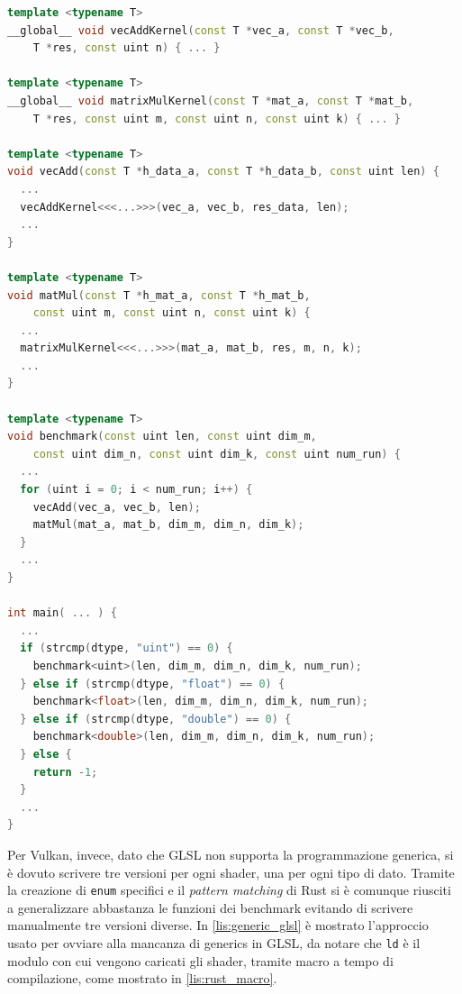 \newpage
\vspace{5mm}
\begin{lstlisting}[language=C++, caption=Programmazione generica in CUDA, label=lis:generic_cuda]
template <typename T>
__global__ void vecAddKernel(const T *vec_a, const T *vec_b,
    T *res, const uint n) { ... }

template <typename T>
__global__ void matrixMulKernel(const T *mat_a, const T *mat_b,
    T *res, const uint m, const uint n, const uint k) { ... }

template <typename T>
void vecAdd(const T *h_data_a, const T *h_data_b, const uint len) {
  ...
  vecAddKernel<<<...>>>(vec_a, vec_b, res_data, len);
  ...
}

template <typename T>
void matMul(const T *h_mat_a, const T *h_mat_b,
    const uint m, const uint n, const uint k) {
  ...
  matrixMulKernel<<<...>>>(mat_a, mat_b, res, m, n, k);
  ...
}

template <typename T>
void benchmark(const uint len, const uint dim_m,
    const uint dim_n, const uint dim_k, const uint num_run) {
  ...
  for (uint i = 0; i < num_run; i++) {
    vecAdd(vec_a, vec_b, len);
    matMul(mat_a, mat_b, dim_m, dim_n, dim_k);
  }
  ...
}

int main( ... ) {
  ...
  if (strcmp(dtype, "uint") == 0) {
    benchmark<uint>(len, dim_m, dim_n, dim_k, num_run);
  } else if (strcmp(dtype, "float") == 0) {
    benchmark<float>(len, dim_m, dim_n, dim_k, num_run);
  } else if (strcmp(dtype, "double") == 0) {
    benchmark<double>(len, dim_m, dim_n, dim_k, num_run);
  } else {
    return -1;
  }
  ...
}
\end{lstlisting}
\vspace{5mm}

Per Vulkan, invece, dato che \gls{GLSL} non supporta la programmazione generica, si è dovuto scrivere tre versioni per ogni shader, una per ogni tipo di dato. Tramite la creazione di \verb|enum| specifici e il \textit{pattern matching} di Rust si è comunque riusciti a generalizzare abbastanza le funzioni dei benchmark evitando di scrivere manualmente tre versioni diverse. In \ref{lis:generic_glsl} è mostrato l'approccio usato per ovviare alla mancanza di generics in \gls{GLSL}, da notare che \verb|ld| è il modulo con cui vengono caricati gli shader, tramite macro a tempo di compilazione, come mostrato in \ref{lis:rust_macro}.

